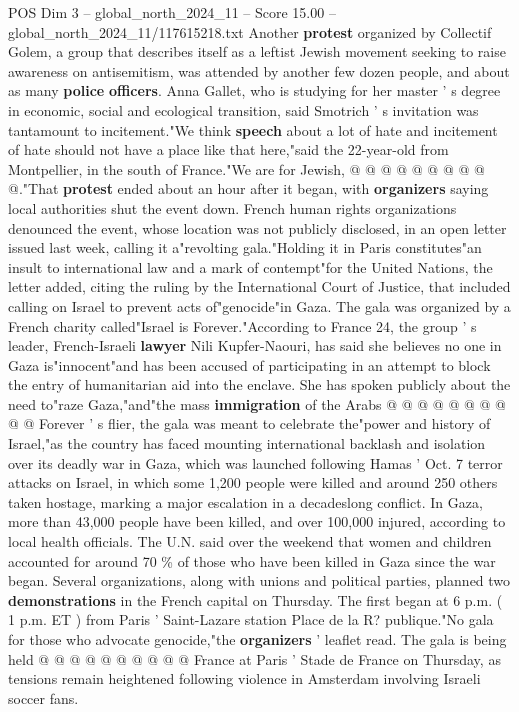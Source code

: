\begin{textsample}{POS Dim 3 – global\_north\_2024\_11 – Score 15.00 – global\_north\_2024\_11/117615218.txt}
Another \textbf{protest} organized by Collectif Golem, a group that describes itself as a leftist Jewish movement seeking to raise awareness on antisemitism, was attended by another few dozen people, and about as many \textbf{police} \textbf{officers}.
Anna Gallet, who is studying for her master ' s degree in economic, social and ecological transition, said Smotrich ' s invitation was tantamount to incitement."We think \textbf{speech} about a lot of hate and incitement of hate should not have a place like that here,"said the 22-year-old from Montpellier, in the south of France."We are for Jewish, @ @ @ @ @ @ @ @ @ @."That \textbf{protest} ended about an hour after it began, with \textbf{organizers} saying local authorities shut the event down.
French human rights organizations denounced the event, whose location was not publicly disclosed, in an open letter issued last week, calling it a"revolting gala."Holding it in Paris constitutes"an insult to international law and a mark of contempt"for the United Nations, the letter added, citing the ruling by the International Court of Justice, that included calling on Israel to prevent acts of"genocide"in Gaza.
The gala was organized by a French charity called"Israel is Forever."According to France 24, the group ' s leader, French-Israeli \textbf{lawyer} Nili Kupfer-Naouri, has said she believes no one in Gaza is"innocent"and has been accused of participating in an attempt to block the entry of humanitarian aid into the enclave.
She has spoken publicly about the need to"raze Gaza,"and"the mass \textbf{immigration} of the Arabs @ @ @ @ @ @ @ @ @ @ Forever ' s flier, the gala was meant to celebrate the"power and history of Israel,"as the country has faced mounting international backlash and isolation over its deadly war in Gaza, which was launched following Hamas ' Oct. 7 terror attacks on Israel, in which some 1,200 people were killed and around 250 others taken hostage, marking a major escalation in a decadeslong conflict.
In Gaza, more than 43,000 people have been killed, and over 100,000 injured, according to local health officials.
The U.N. said over the weekend that women and children accounted for around 70 \% of those who have been killed in Gaza since the war began.
Several organizations, along with unions and political parties, planned two \textbf{demonstrations} in the French capital on Thursday.
The first began at 6 p.m. ( 1 p.m.
ET ) from Paris ' Saint-Lazare station Place de la R? publique."No gala for those who advocate genocide,"the \textbf{organizers} ' leaflet read.
The gala is being held @ @ @ @ @ @ @ @ @ @ France at Paris ' Stade de France on Thursday, as tensions remain heightened following violence in Amsterdam involving Israeli soccer fans.

\end{textsample}
